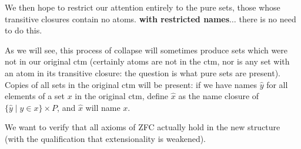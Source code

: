 \documentclass[12pt]{book}
\begin{document}
We then hope to restrict our attention entirely to the pure sets, those whose transitive closures contain no atoms.  {\bf with restricted names$\ldots$}  there is no need to do this.

As we will see, this process of collapse will sometimes produce sets which were not in our original ctm (certainly atoms are not in the ctm, nor is any set with an atom in its transitive closure:  the question is what pure sets are present).  Copies of all sets in the original ctm
will be present:  if we have names $\hat{y}$ for all elements of a set $x$ in the original ctm, define $\hat{x}$ as the name closure of
$\{\hat{y} \mid y \in x\} \times P$, and $\hat{x}$ will name $x$.

We want to verify that all axioms of ZFC actually hold in the new structure (with the qualification that extensionality is weakened).
\end{document}
